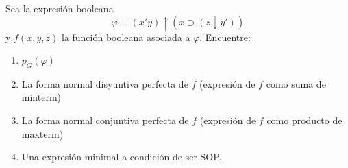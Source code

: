 \begin{exercise}
  Sea la expresión booleana
  \begin{equation*}
    \varphi\equiv (x'y)\uparrow(x\supset(z\downarrow y'))
  \end{equation*}
  y $f(x,y,z)$ la función booleana asociada a $\varphi$. Encuentre:
  \begin{enumerate}
  \item $p_{G}(\varphi)$
  \item La forma normal disyuntiva perfecta de $f$ (expresión de $f$
    como suma de minterm) 
  \item La forma normal conjuntiva perfecta de $f$ (expresión de $f$
    como producto de maxterm)
  \item Una expresión minimal a condición de ser SOP.
  \end{enumerate}
\end{exercise}

